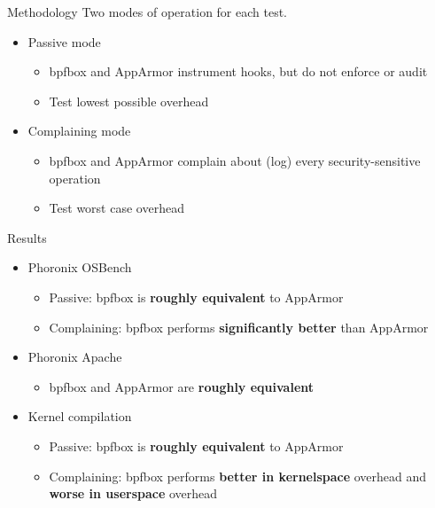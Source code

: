 \documentclass[12pt, dvipsnames, aspectratio=169]{beamer}
\begin{document}
\begin{frame}[c]{Methodology}
Two modes of operation for each test.
\vfill
\begin{itemize}
    \item Passive mode
    \begin{itemize}
        \item bpfbox and AppArmor instrument hooks, but do not enforce or audit
        \item Test lowest possible overhead
    \end{itemize}
    \vfill
    \item Complaining mode
    \begin{itemize}
        \item bpfbox and AppArmor complain about (log) every security-sensitive operation
        \item Test worst case overhead
    \end{itemize}
\end{itemize}
\end{frame}

\begin{frame}[c]{Results}
\begin{itemize}
    \item Phoronix OSBench
    \begin{itemize}
        \item Passive: bpfbox is \textbf{roughly equivalent} to AppArmor
        \item Complaining: bpfbox performs \textbf{significantly better} than AppArmor
    \end{itemize}

    \vfill
    \item Phoronix Apache
    \begin{itemize}
        \item bpfbox and AppArmor are \textbf{roughly equivalent}
    \end{itemize}

    \vfill
    \item Kernel compilation
    \begin{itemize}
        \item Passive: bpfbox is \textbf{roughly equivalent} to AppArmor
        \item Complaining: bpfbox performs \textbf{better in kernelspace} overhead and \textbf{worse in userspace} overhead
    \end{itemize}
\end{itemize}
\end{frame}
\end{document}
